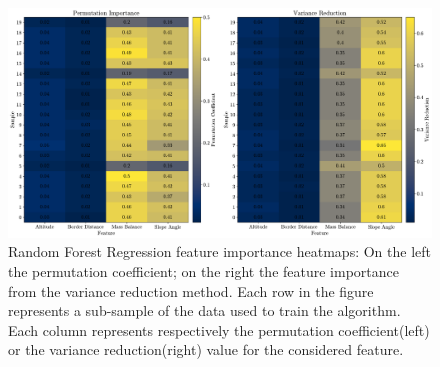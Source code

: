 \begin{figure}[!tp]
	\centering		  
	\includegraphics[width=1.\textwidth]{figures/RFR_heatmap.pdf}
	\caption{Random Forest Regression feature importance heatmaps: On the left the permutation coefficient; on the right the feature importance from the variance reduction method. Each row in the figure represents a sub-sample of the data used to train the algorithm. Each column represents respectively the permutation coefficient(left) or the variance reduction(right) value for the considered feature.}
	\label{fig:rfr-heatmap}
\end{figure}


